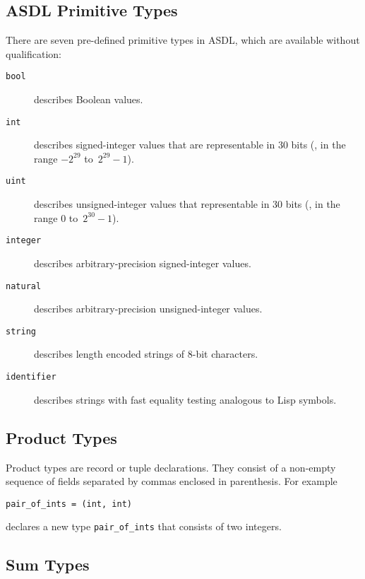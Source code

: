 \subsection{ASDL Primitive Types}
There are seven pre-defined primitive types in ASDL, which are available without qualification:
\begin{description}
  \item[\normalfont\texttt{\color{\cdColor}bool}] describes Boolean values.
  \item[\normalfont\texttt{\color{\cdColor}int}] describes signed-integer values that are representable in 30 bits
    (\ie{}, in the range ${-}2^{29}$ to~\mbox{$2^{29}-1$}).
  \item[\normalfont\texttt{\color{\cdColor}uint}] describes unsigned-integer values that representable in 30 bits
    (\ie{}, in the range $0$ to~$2^{30}-1$).
  \item[\normalfont\texttt{\color{\cdColor}integer}] describes arbitrary-precision signed-integer values.
  \item[\normalfont\texttt{\color{\cdColor}natural}] describes arbitrary-precision unsigned-integer values.
  \item[\normalfont\texttt{\color{\cdColor}string}] describes length encoded strings of 8-bit characters.
  \item[\normalfont\texttt{\color{\cdColor}identifier}] describes strings with fast equality testing
    analogous to Lisp symbols.
\end{description}%


\subsection{Product Types}
Product types are record or tuple declarations.
They consist of a non-empty 
sequence of fields separated by commas enclosed in parenthesis. For
example 
\begin{code}\begin{lstlisting}[language=ASDL] 
pair_of_ints = (int, int) 
\end{lstlisting}\end{code}%
declares a new type \lstinline[language=ASDL]!pair_of_ints! that consists of two integers.

\subsection{Sum Types}

